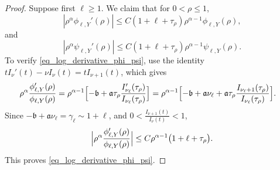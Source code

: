 \documentclass[12pt]{amsart}
\begin{document}
\begin{proof}
Suppose first $\ell\ge 1$. We claim that for $0<\rho\leq1$,
\begin{equation}\label{eq_log_derivative_phi_psi}
    |\rho^\alpha\phi_{\ell,Y}'(\rho)|
    \leq
    C(1+\ell+\tau_\rho) \rho^{\alpha-1}\phi_{\ell,Y}(\rho),
\end{equation}
and
\begin{equation}\label{eq_log_derivative_psi}
    |\rho^\alpha\psi_{\ell,Y}'(\rho)|
    \leq
    C(1+\ell+\tau_\rho) \rho^{\alpha-1}\psi_{\ell,Y}(\rho).
\end{equation}
To verify \eqref{eq_log_derivative_phi_psi}, use the identity $tI_\nu'(t)-\nu I_\nu(t)=tI_{\nu+1}(t)$,
which gives
\begin{align*}
\rho^\alpha\frac{\phi_{\ell,Y}'(\rho)}{\phi_{\ell,Y}(\rho)}
&=\rho^{\alpha-1}\Bigl[-\mathfrak b+\mathfrak a \tau_\rho \frac{I_{\nu_\ell}'(\tau_\rho)}{I_{\nu_\ell}(\tau_\rho)}\Bigr] =\rho^{\alpha-1}\Bigl[-\mathfrak b+\mathfrak a\nu_\ell+\mathfrak a \tau_\rho \frac{I_{\nu_\ell+1}(\tau_\rho)}{I_{\nu_\ell}(\tau_\rho)}\Bigr].
\end{align*}
Since $-\mathfrak b+\mathfrak a\nu_\ell =\gamma_\ell \sim 1+\ell$, and $0<\frac{I_{\nu+1}(t)}{I_\nu(t)}< 1$,
\begin{equation*}
    \Bigl|\rho^\alpha\frac{\phi_{\ell,Y}'(\rho)}{\phi_{\ell,Y}(\rho)}\Bigr|
    \le
    C\rho^{\alpha-1}\bigl(1+\ell + \tau_\rho\bigr).
\end{equation*}
This proves \eqref{eq_log_derivative_phi_psi}.


\end{proof}
\end{document}
